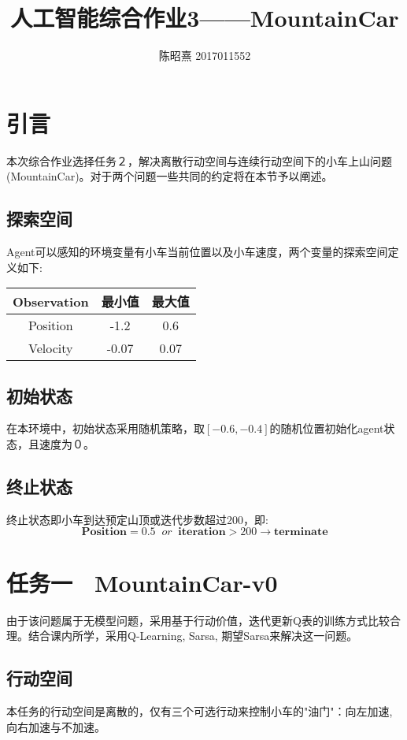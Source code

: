 \documentclass[UTF8]{ctexart}
\begin{document}
\title{人工智能综合作业3——MountainCar}
\author{陈昭熹 2017011552}
\maketitle
\tableofcontents
\newpage
\section{引言}
本次综合作业选择任务２，解决离散行动空间与连续行动空间下的小车上山问题(MountainCar)。对于两个问题一些共同的约定将在本节予以阐述。
\subsection{探索空间}
Agent可以感知的环境变量有小车当前位置以及小车速度，两个变量的探索空间定义如下:
\begin{table}[H]
    \centering
    \begin{tabular}{ccc}
        \hline
        Observation& 最小值& 最大值\\
        \hline
        Position & -1.2 & 0.6\\
        Velocity & -0.07 & 0.07\\
        \hline
    \end{tabular}
    \end{table}

\subsection{初始状态}
在本环境中，初始状态采用随机策略，取$[-0.6,-0.4]$的随机位置初始化agent状态，且速度为０。
\subsection{终止状态}
终止状态即小车到达预定山顶或迭代步数超过200，即:
\begin{equation}
    \textbf{Position} =0.5\;\; or \;\;\textbf{iteration} > 200 \rightarrow \textbf{terminate}
\end{equation}

\section{任务一　MountainCar-v0}
由于该问题属于无模型问题，采用基于行动价值，迭代更新Q表的训练方式比较合理。结合课内所学，采用Q-Learning, Sarsa, 期望Sarsa来解决这一问题。
\subsection{行动空间}
本任务的行动空间是离散的，仅有三个可选行动来控制小车的"油门"：向左加速,向右加速与不加速。
\end{document}
